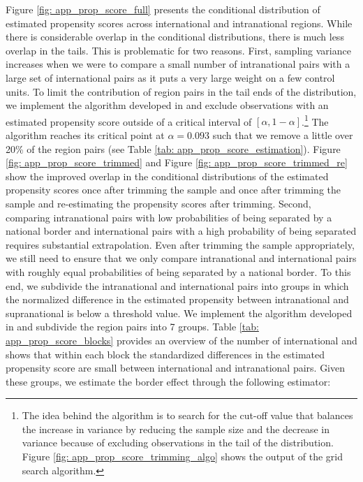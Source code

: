 Figure \ref{fig: app_prop_score_full} presents the conditional distribution of estimated propensity scores across international and intranational regions. While there is considerable overlap in the conditional distributions, there is much less overlap in the tails. This is problematic for two reasons. First, sampling variance increases when we were to compare a small number of intranational pairs with a large set of international pairs as it puts a very large weight on a few control units. To limit the contribution of region pairs in the tail ends of the distribution, we implement the algorithm developed in \citet{Crump2009} and exclude observations with an estimated propensity score outside of a critical interval of $[\alpha,1-\alpha]$.\footnote{The idea behind the algorithm is to search for the cut-off value that balances the increase in variance by reducing the sample size and the decrease in variance because of excluding observations in the tail of the distribution. Figure \ref{fig: app_prop_score_trimming_algo} shows the output of the grid search algorithm.} The algorithm reaches its critical point at $\alpha = 0.093$ such that we remove a little over 20\% of the region pairs (see Table \ref{tab: app_prop_score_estimation}). Figure \ref{fig: app_prop_score_trimmed} and Figure \ref{fig: app_prop_score_trimmed_re} show the improved overlap in the conditional distributions of the estimated propensity scores once after trimming the sample and once after trimming the sample and re-estimating the propensity scores after trimming. Second, comparing intranational pairs with low probabilities of being separated by a national border and international pairs with a high probability of being separated requires substantial extrapolation. Even after trimming the sample appropriately, we still need to ensure that we only compare intranational and international pairs with roughly equal probabilities of being separated by a national border. To this end, we subdivide the intranational and international pairs into groups in which the normalized difference in the estimated propensity between intranational and supranational is below a threshold value. We implement the algorithm developed in \citet{Imbens2015} and subdivide the region pairs into 7 groups. Table \ref{tab: app_prop_score_blocks} provides an overview of the number of international and shows that within each block the standardized differences in the estimated propensity score are small between international and intranational pairs. Given these groups, we estimate the border effect through the following estimator: 

